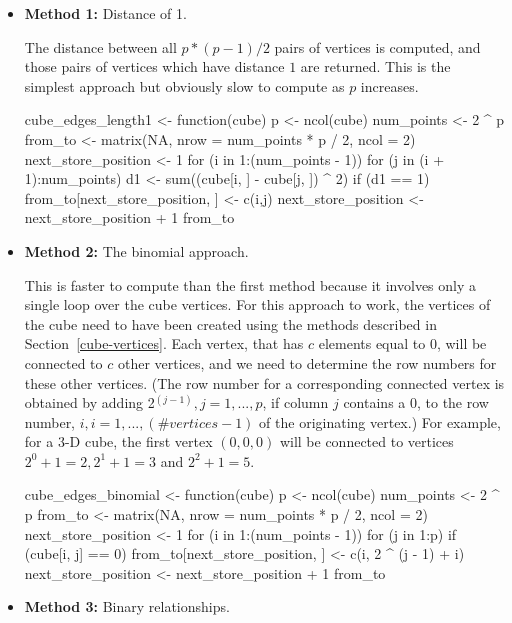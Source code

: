 \begin{itemize}

  \item {\bf Method 1:} Distance of 1.

    The distance between all $p * (p - 1) / 2$ pairs of vertices is
    computed, and those pairs of vertices which have distance $1$ are
    returned. This is the simplest approach but obviously slow to
    compute as $p$ increases.

\begin{example}
cube_edges_length1 <- function(cube) {
  p <- ncol(cube)
  num_points <- 2 ^ p
  from_to <- matrix(NA, nrow = num_points * p / 2, ncol = 2)
  next_store_position <- 1
  for (i in 1:(num_points - 1)) {
    for (j in (i + 1):num_points) {
      d1 <- sum((cube[i, ] - cube[j, ]) ^ 2)
      if (d1 == 1) {
        from_to[next_store_position, ] <- c(i,j)
        next_store_position <- next_store_position + 1
      }
    }
  }
  from_to
}
\end{example}

  \item {\bf Method 2:} The binomial approach.

    This is faster to compute than the first method because it
    involves only a single loop over the cube vertices. For this
    approach to work, the vertices of the cube need to have been
    created using the methods described in
    Section~\ref{cube-vertices}. Each vertex, that has $c$ elements
    equal to 0, will be connected to $c$ other vertices, and we need
    to determine the row numbers for these other vertices. (The row
    number for a corresponding connected vertex is obtained by adding
    2$^{(j-1)}, j=1,...,p$, if column $j$ contains a 0, to the row
    number, $i, i=1,...,(\#vertices-1)$ of the originating vertex.) For
    example, for a 3-D cube, the first vertex $(0,0,0)$ will be
    connected to vertices $2^0+1=2, 2^1+1=3$ and $2^2+1=5$.

\begin{example}
cube_edges_binomial <- function(cube) {
  p <- ncol(cube)
  num_points <- 2 ^ p
  from_to <- matrix(NA, nrow = num_points * p / 2, ncol = 2)
  next_store_position <- 1
  for (i in 1:(num_points - 1)) {
    for (j in 1:p) {
      if (cube[i, j] == 0) {
        from_to[next_store_position, ] <- c(i, 2 ^ (j - 1) + i)
        next_store_position <- next_store_position + 1
      }
    }
  }
  from_to
}
\end{example}

  \item {\bf Method 3:} Binary relationships.


\end{itemize}
